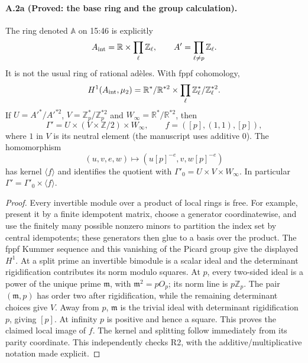 \paragraph{A.2a (Proved: the base ring and the group calculation).}
The ring denoted $\mathbb A$ on 15:46 is explicitly
\[
 A_{\rm int}=\mathbb R\times\prod_\ell\mathbb Z_\ell,
 \qquad A'=\prod_{\ell\ne p}\mathbb Z_\ell.
\]
It is not the usual ring of rational adèles. With fppf cohomology,
\[
 H^1(A_{\rm int},\mu_2)
 =\mathbb R^*/\mathbb R^{*2}\times
   \prod_\ell\mathbb Z_\ell^*/\mathbb Z_\ell^{*2}.
\]
If $U=A'^*/A'^{*2}$, $V=\mathbb Z_p^*/\mathbb Z_p^{*2}$ and
$W_\infty=\mathbb R^*/\mathbb R^{*2}$, then
\[
 \Gamma'=U\times(V\times\mathbb Z/2)\times W_\infty,
 \qquad f=([p],(1,1),[p]),
\]
where $1$ in $V$ is its neutral element (the manuscript uses additive
$0$). The homomorphism
\[
 (u,v,e,w)\longmapsto(u[p]^{-e},v,w[p]^{-e})
\]
has kernel $\langle f\rangle$ and identifies the quotient with
$\Gamma'_0=U\times V\times W_\infty$. In particular
$\Gamma'=\Gamma'_0\times\langle f\rangle$.

\begin{proof}
Every invertible module over a product of local rings is free. For
example, present it by a finite idempotent matrix, choose a generator
coordinatewise, and use the finitely many possible nonzero minors to
partition the index set by central idempotents; these generators then
glue to a basis over the product. The fppf Kummer sequence and this
vanishing of the Picard group give the displayed $H^1$.
At a split prime an invertible bimodule is a scalar ideal and the
determinant rigidification contributes its norm modulo squares.
At $p$, every two-sided ideal is a power of the unique prime
$\mathfrak m$, with $\mathfrak m^2=pO_p$; its norm line is
$p\mathbb Z_p$. The pair $(\mathfrak m,p)$ has order two after
rigidification, while the remaining determinant choices give $V$.
Away from $p$, $\mathfrak m$ is the trivial ideal with determinant
rigidification $p$, giving $[p]$. At infinity $p$ is positive and hence
a square. This proves the claimed local image of $f$. The kernel and
splitting follow immediately from its parity coordinate.
This independently checks R2, with the additive/multiplicative
notation made explicit.
\end{proof}


